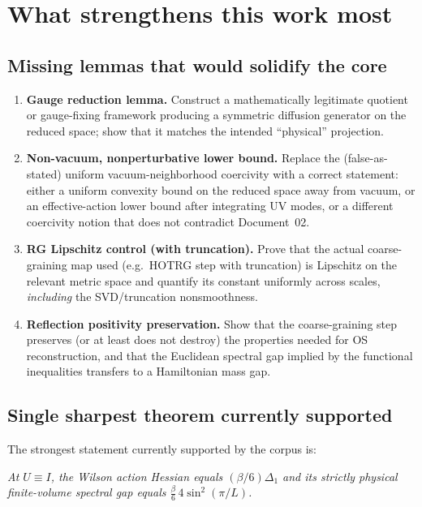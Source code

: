 \documentclass[11pt]{article}
\begin{document}
\section{What strengthens this work most}

\subsection*{Missing lemmas that would solidify the core}
\begin{enumerate}[leftmargin=*]
\item \textbf{Gauge reduction lemma.}
Construct a mathematically legitimate quotient or gauge-fixing framework producing a symmetric diffusion generator on the reduced space; show that it matches the intended ``physical'' projection.

\item \textbf{Non-vacuum, nonperturbative lower bound.}
Replace the (false-as-stated) uniform vacuum-neighborhood coercivity with a correct statement:
either a uniform convexity bound on the reduced space away from vacuum, or an effective-action lower bound after integrating UV modes, or a different coercivity notion that does not contradict Document~02.

\item \textbf{RG Lipschitz control (with truncation).}
Prove that the actual coarse-graining map used (e.g.\ HOTRG step with truncation) is Lipschitz on the relevant metric space and quantify its constant uniformly across scales, \emph{including} the SVD/truncation nonsmoothness.

\item \textbf{Reflection positivity preservation.}
Show that the coarse-graining step preserves (or at least does not destroy) the properties needed for OS reconstruction, and that the Euclidean spectral gap implied by the functional inequalities transfers to a Hamiltonian mass gap.
\end{enumerate}

\subsection*{Single sharpest theorem currently supported}
The strongest statement currently supported by the corpus is:

\medskip
\noindent
\emph{At $U\equiv I$, the Wilson action Hessian equals $(\beta/6)\Delta_1$ and its strictly physical finite-volume spectral gap equals $\frac{\beta}{6}\,4\sin^2(\pi/L)$.}
\medskip
\end{document}
